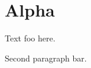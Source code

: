 \documentclass{article}
\begin{document}
\section{Alpha}
Text foo here.

Second paragraph bar.
\printindex
\end{document}
